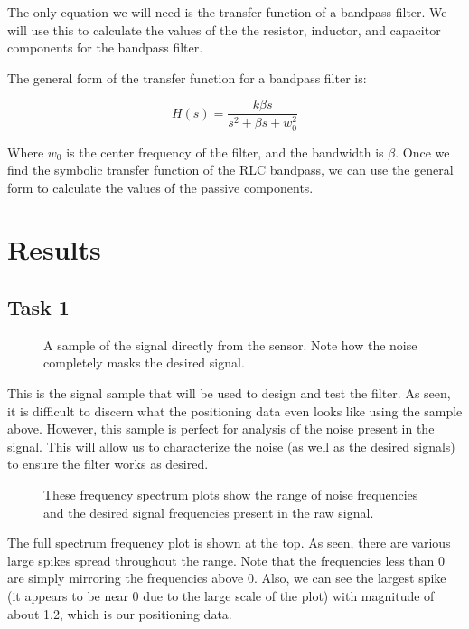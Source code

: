 \documentclass[12pt]{report}
\begin{document}
The only equation we will need is the transfer function of a
bandpass filter. We will use this to calculate the values of the the
resistor, inductor, and capacitor components for the bandpass filter.

The general form of the transfer function for a bandpass filter is:

$$ H(s) = \frac{k\beta s}{s^2+\beta s + w_0^2} $$

Where $w_0$ is the center frequency of the filter, and the bandwidth is $\beta$. Once we find the symbolic transfer function of the RLC bandpass, we can use the general form to calculate the values of the passive components.

\hypertarget{results}{%
\chapter{Results}\label{results}}

\hypertarget{task-1-1}{%
\section{Task 1}\label{task-1-1}}

    \begin{figure}[h]
\begin{center}
\end{center}
\caption{A sample of the signal directly from the sensor. Note how the noise completely masks the desired signal.}
\end{figure}
    
This is the signal sample that will be used to design and test the
filter. As seen, it is difficult to discern what the positioning data
even looks like using the sample above. However, this sample is perfect
for analysis of the noise present in the signal. This will allow us to
characterize the noise (as well as the desired signals) to ensure the
filter works as desired.
\pagebreak
\begin{figure}[h]
\begin{center}
\end{center}
\caption{These frequency spectrum plots show the range of noise frequencies and the desired signal frequencies present in the raw signal.}
\end{figure}
    
The full spectrum frequency plot is shown at the top. As seen, there are
various large spikes spread throughout the range. Note that the
frequencies less than 0 are simply mirroring the frequencies above 0.
Also, we can see the largest spike (it appears to be near 0 due to the
large scale of the plot) with magnitude of about 1.2, which is our
positioning data.
\end{document}

